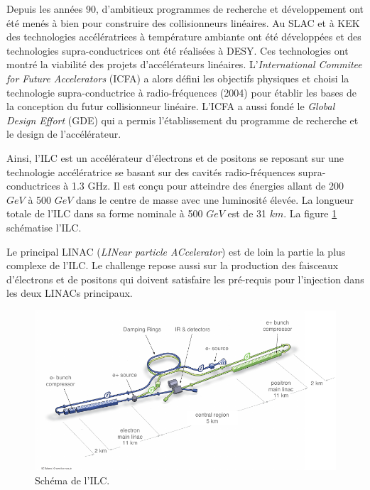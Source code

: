   \medskip

  Depuis les ann\'ees 90, d'ambitieux programmes de recherche et développement ont \'et\'e men\'es \`a bien pour construire des collisionneurs lin\'eaires. Au SLAC et \`a KEK des technologies acc\'el\'eratrices \`a temp\'erature ambiante ont \'et\'e d\'evelopp\'ees et des technologies supra-conductrices ont \'et\'e r\'ealis\'ees \`a DESY. Ces technologies ont montr\'e la viabilit\'e des projets d'acc\'el\'erateurs lin\'eaires. L'\textit{International Commitee for Future Accelerators} (ICFA) a alors d\'efini les objectifs physiques et choisi la technologie supra-conductrice \`a radio-fr\'equences (2004) pour \'etablir les bases de la conception du futur collisionneur lin\'eaire. L'ICFA a aussi fond\'e le \textit{Global Design Effort} (GDE) qui a permis l'établissement du programme de recherche et le design de l'acc\'el\'erateur.
  
  \medskip
  
  Ainsi, l'ILC est un acc\'el\'erateur d'\'electrons et de positons se reposant sur une technologie acc\'el\'eratrice se basant sur des cavit\'es radio-fr\'equences supra-conductrices \`a 1.3 GHz. Il est con\c{c}u pour atteindre des \'energies allant de 200 $GeV$ \`a 500 $GeV$ dans le centre de masse avec une luminosit\'e \'elev\'ee. La longueur totale de l'ILC dans sa forme nominale \`a 500 $GeV$ est de 31 $km$. La figure \ref{fig:ILC_schema} sch\'ematise l'ILC.
  
  \medskip
  
  
  Le principal LINAC (\textit{LINear particle ACcelerator}) est de loin la partie la plus complexe de l'ILC. Le challenge repose aussi sur la production des faisceaux d'\'electrons et de positons qui doivent satisfaire les pr\'e-requis pour l'injection dans les deux LINACs principaux.
  
    \begin{figure}[!htb]
    \begin{center} 
      \includegraphics[scale=1.0]{./figures/ILC_schema.pdf}
      \caption{Sch\'ema de l'ILC.}
      \label{fig:ILC_schema}
    \end{center}
  \end{figure}
  
